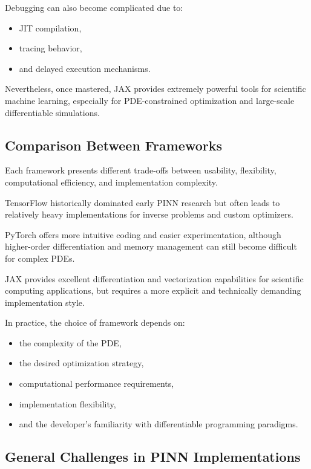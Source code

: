 Debugging can also become complicated due to:
\begin{itemize}
    \item JIT compilation,
    \item tracing behavior,
    \item and delayed execution mechanisms.
\end{itemize}

Nevertheless, once mastered, JAX provides extremely powerful tools for scientific machine learning, especially for PDE-constrained optimization and large-scale differentiable simulations.

\subsection{Comparison Between Frameworks}

Each framework presents different trade-offs between usability, flexibility, computational efficiency, and implementation complexity.

TensorFlow historically dominated early PINN research but often leads to relatively heavy implementations for inverse problems and custom optimizers.

PyTorch offers more intuitive coding and easier experimentation, although higher-order differentiation and memory management can still become difficult for complex PDEs.

JAX provides excellent differentiation and vectorization capabilities for scientific computing applications, but requires a more explicit and technically demanding implementation style.

In practice, the choice of framework depends on:
\begin{itemize}
    \item the complexity of the PDE,
    \item the desired optimization strategy,
    \item computational performance requirements,
    \item implementation flexibility,
    \item and the developer's familiarity with differentiable programming paradigms.
\end{itemize}

\subsection{General Challenges in PINN Implementations}

